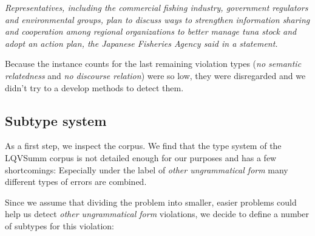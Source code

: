 \documentclass[a4paper,10pt]{scrartcl}
\theoremstyle{style}
\begin{document}
\quad\textit{Representatives, including the commercial fishing industry, government regulators and environmental groups, plan to discuss ways to strengthen information sharing and cooperation among regional organizations to better manage tuna stock and adopt an action plan, the Japanese Fisheries Agency said in a statement.}

Because the instance counts for the last remaining violation types (\textit{no semantic relatedness} and \textit{no discourse relation}) were so low, they were disregarded and we didn't try to a develop methods to detect them.

\subsection{Subtype system}
\label{s_subtypes}

As a first step, we inspect the corpus. We find that the type system of the LQVSumm corpus \citep{friedrichlqvsumm} is not detailed enough for our purposes and has a few shortcomings: Especially under the label of \textit{other ungrammatical form} many different types of errors are combined.

Since we assume that dividing the problem into smaller, easier problems could help us detect \textit{other ungrammatical form} violations, we decide to define a number of subtypes for this violation:
\end{document}
